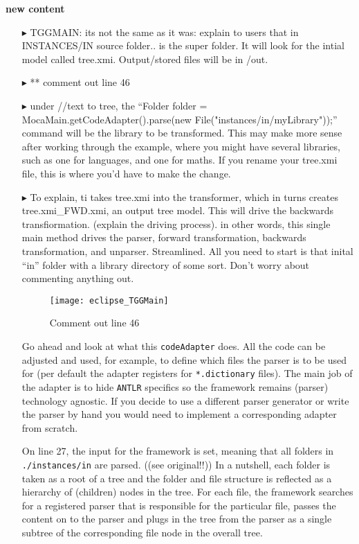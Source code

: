 {\bf new content }
\begin{enumerate}

\item[$\blacktriangleright$] TGGMAIN: its not the same as it was: explain to users that in INSTANCES/IN source folder.. is the super folder. It will look for
the intial model called tree.xmi. Output/stored files will be in /out. 

\item[$\blacktriangleright$] ** comment out line 46

\item[$\blacktriangleright$]  under //text to tree, the ``Folder folder = MocaMain.getCodeAdapter().parse(new File("instances/in/myLibrary"));'' command will be
the library to be transformed. This may make more sense after working through the example, where you might have several libraries, such as one for languages,
and one for maths.
If you rename your tree.xmi file, this is where you'd have to make the change.

\item[$\blacktriangleright$] To explain, ti takes tree.xmi into the transformer, which in turns creates tree.xmi\_FWD.xmi, an output tree model. This will drive
the backwards transfiormation. (explain the driving process). in other words, this single main method drives the parser, forward transformation, backwards
transformation, and unparser. Streamlined. All you need to start is that inital ``in'' folder with a library directory of some sort. Don't worry about
commenting anything out.


\begin{figure}[htp]
\begin{center}
 \texttt{[image: eclipse\_TGGMain]}
  \caption{Comment out line 46}
  \label{eclipse:TGGMain} 
\end{center}
\end{figure}

Go ahead and look at what this \texttt{codeAdapter} does. All the code can be adjusted and used, for example, to define which files the parser is
to be used for (per default the adapter registers for \texttt{*.dictionary} files). The main job of the adapter is to hide \texttt{ANTLR} specifics so the
framework remains (parser) technology agnostic. If you decide to use a different parser generator or write the parser by hand you would need to implement a
corresponding adapter from scratch.

On line 27, the input for the framework is set, meaning that all folders in \texttt{./instances/in} are parsed. ((see original!!))
In a nutshell, each folder is taken as a root of a tree and the folder and file structure is reflected as a hierarchy of (children) nodes in the tree.
For each file, the framework searches for a registered parser that is responsible for the particular file, passes the content on to the parser and plugs in the
tree from the parser as a single subtree of the corresponding file node in the overall tree.  


\end{enumerate}
